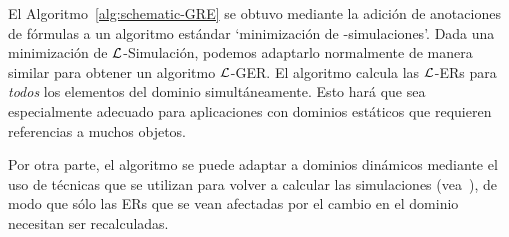 
%


El Algoritmo~\ref{alg:schematic-GRE} se obtuvo mediante la adici\'on de anotaciones de f\'ormulas
a un algoritmo est\'andar `minimizaci\'on de \EL-simulaciones'. Dada una minimizaci\'on de
$\mathcal{L}$-Simulaci\'on, podemos adaptarlo normalmente de
manera similar para obtener un algoritmo $\mathcal{L}$-GER.
El algoritmo calcula las $\mathcal{L}$-ERs para \emph{todos} los elementos del
dominio simult\'aneamente.
Esto har\'a que sea especialmente adecuado para aplicaciones con
dominios est\'aticos que requieren referencias a muchos objetos.


Por otra parte, el algoritmo se puede adaptar
a dominios din\'amicos mediante el uso de t\'ecnicas que se utilizan para volver a calcular las simulaciones (vea~\cite{saha:incre07}),
de modo que s\'olo las ERs que se vean afectadas por el cambio en el dominio necesitan ser recalculadas.


